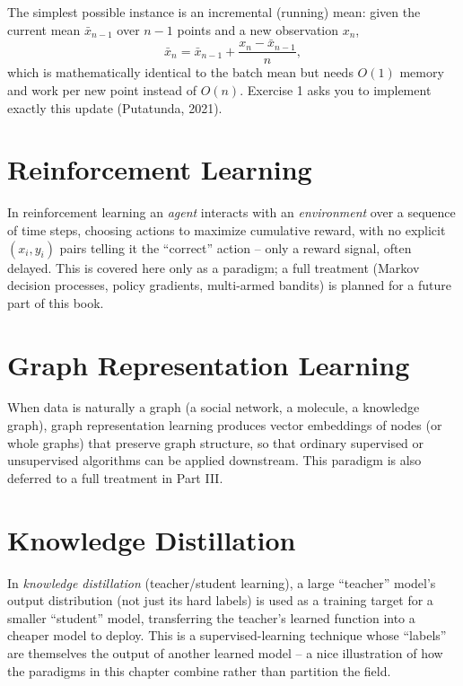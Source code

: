 \documentclass[11pt]{article}
\begin{document}
The simplest possible instance is an incremental (running) mean: given the
current mean $\bar x_{n-1}$ over $n-1$ points and a new observation $x_n$,
\[
  \bar x_n = \bar x_{n-1} + \frac{x_n - \bar x_{n-1}}{n},
\]
which is mathematically identical to the batch mean but needs $O(1)$ memory
and work per new point instead of $O(n)$. Exercise 1 asks you to implement
exactly this update (Putatunda, 2021).

\section{Reinforcement Learning}

\begin{definition}
In reinforcement learning an \emph{agent} interacts with an
\emph{environment} over a sequence of time steps, choosing actions to
maximize cumulative reward, with no explicit $(x_i, y_i)$ pairs telling it
the ``correct'' action -- only a reward signal, often delayed. This is
covered here only as a paradigm; a full treatment (Markov decision
processes, policy gradients, multi-armed bandits) is planned for a future
part of this book.
\end{definition}

\section{Graph Representation Learning}

\begin{definition}
When data is naturally a graph (a social network, a molecule, a knowledge
graph), graph representation learning produces vector embeddings of nodes
(or whole graphs) that preserve graph structure, so that ordinary
supervised or unsupervised algorithms can be applied downstream. This
paradigm is also deferred to a full treatment in Part III.
\end{definition}

\section{Knowledge Distillation}

\begin{definition}
In \emph{knowledge distillation} (teacher/student learning), a large
``teacher'' model's output distribution (not just its hard labels) is used
as a training target for a smaller ``student'' model, transferring the
teacher's learned function into a cheaper model to deploy. This is a
supervised-learning technique whose ``labels'' are themselves the output of
another learned model -- a nice illustration of how the paradigms in this
chapter combine rather than partition the field.
\end{definition}
\end{document}
